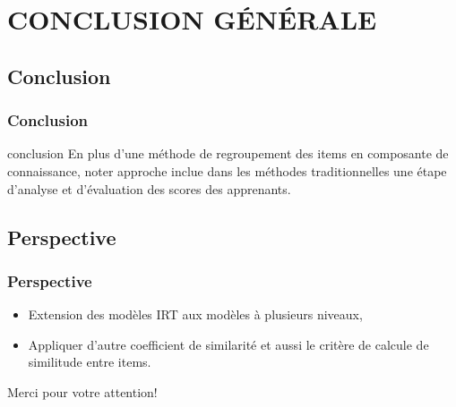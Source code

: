 \documentclass[aspectratio=169,professionalfonts, 12pt]{beamer}
\begin{document}
\section{CONCLUSION G\'EN\'ERALE}

\subsection{Conclusion}

\begin{frame}
  \frametitle{Conclusion}
  \justifying 
  \begin{minipage}{\textwidth}
    \begin{block}{conclusion}
      En plus d’une méthode de regroupement des items en composante de connaissance, noter approche inclue dans les méthodes traditionnelles une étape d’analyse et d’évaluation des scores des apprenants.
    \end{block}
  \end{minipage}
\end{frame}


\subsection{Perspective}

\begin{frame}
  \frametitle{Perspective}
  \justifying 
  \begin{minipage}{\textwidth}
    \begin{itemize}
      \item Extension des modèles IRT aux modèles à plusieurs niveaux,
      \item Appliquer d’autre coefficient de similarité et aussi le critère de calcule de similitude entre items.
    \end{itemize}
  \end{minipage}
\end{frame}

\begin{frame}[plain,c]
  \begin{center}
  \Huge Merci pour votre attention!
  \end{center}
\end{frame}
\end{document}
